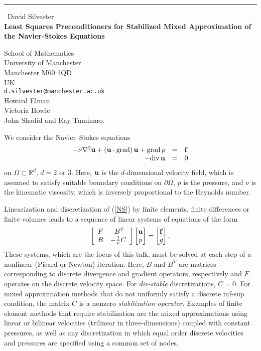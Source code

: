\documentclass{report}
\begin{document}
\begin{center}
\rule{6in}{1pt} \
{\large David Silvester \\
{\bf Least Squares Preconditioners for Stabilized Mixed Approximation of the Navier-Stokes Equations }}

School of Mathematics \\ University of Manchester \\ Manchester M60 1QD \\ UK
\\
{\tt d.silvester@manchester.ac.uk}\\
Howard Elman\\
Victoria Howle\\
	John Shadid and Ray Tuminaro.\end{center}

We consider the Navier--Stokes equations
\begin{equation} \label{NS}
\begin{array}{rcl}
-\nu \nabla^2 {\bf u}
+ ({\bf u} \cdot {\rm grad})\, {\bf u} +
{\rm grad}\, p &= &{\bf f} \\
-{\rm div}\, {\bf u} &= &0
\end{array}
\end{equation}
on $\Omega \subset \mathbb{R}^d$, $d=2$ or $3$. Here, ${\bf u}$
is the $d$-dimensional velocity field, which is assumed to satisfy
suitable boundary conditions on $\partial \Omega$, $p$ is the
pressure, and $\nu$ is the kinematic viscosity, which is
inversely proportional to the Reynolds number.

Linearization and discretization of (\ref{NS}) by finite elements, finite
differences or finite volumes leads to a sequence of linear systems of
equations of the form
\begin{equation} \label{NSdiscretelinearStabilized}
\left[
\begin{array}{lc}
F & \ B^T \\ B & -\frac{1}{\nu}C
\end{array}
\right]
\begin{bmatrix}
{\bf u}\\ p
\end{bmatrix}
=
\begin{bmatrix}
{\bf f}\\ g
\end{bmatrix}.
\end{equation}
These systems, which are the focus of this talk, must be solved
at each step of a nonlinear (Picard or Newton) iteration. Here, $B$ and
$B^T$ are matrices corresponding to discrete divergence and gradient
operators, respectively and $F$ operates on the discrete velocity space.
For {\em div-stable} discretizations, $C=0$. For mixed approximation
methods that do not
uniformly satisfy a discrete inf-sup condition, the matrix $C$ is
a nonzero {\em stabilization operator}.
Examples of finite element methods that require stabilization are
the mixed approximations using linear or bilinear velocities
(trilinear in three-dimensions) coupled with constant pressures,
as well as any discretization in which equal order discrete velocities and
pressures are specified using a common set of nodes.
\end{document}

